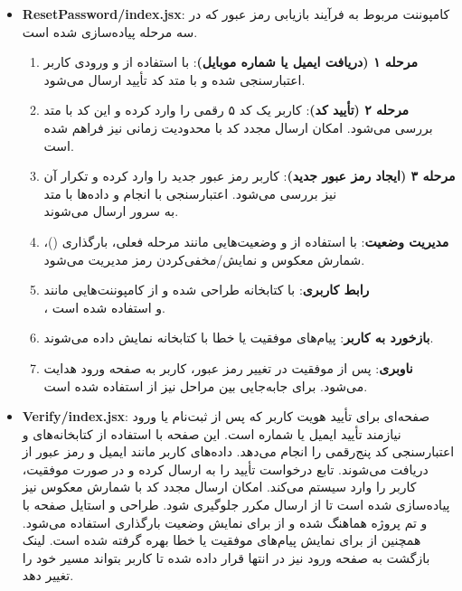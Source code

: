 \begin{itemize}
\begin{itemize}
    			\item \textbf{ResetPassword/index.jsx}: کامپوننت مربوط به فرآیند بازیابی رمز عبور که در سه مرحله پیاده‌سازی شده است.  
    			\begin{enumerate}
    				\item \textbf{مرحله ۱ (دریافت ایمیل یا شماره موبایل)}: با استفاده از  و  ورودی کاربر اعتبارسنجی شده و با متد  کد تأیید ارسال می‌شود.  
    				\item \textbf{مرحله ۲ (تأیید کد)}: کاربر یک کد ۵ رقمی را وارد کرده و این کد با متد \\  بررسی می‌شود. امکان ارسال مجدد کد با محدودیت زمانی نیز فراهم شده است.  
    				\item \textbf{مرحله ۳ (ایجاد رمز عبور جدید)}: کاربر رمز عبور جدید را وارد کرده و تکرار آن نیز بررسی می‌شود. اعتبارسنجی با  انجام و داده‌ها با متد \\ به سرور ارسال می‌شوند.  
    				\item \textbf{مدیریت وضعیت}: با استفاده از  و  وضعیت‌هایی مانند مرحله فعلی، بارگذاری ()، شمارش معکوس و نمایش/مخفی‌کردن رمز مدیریت می‌شود.  
    				\item \textbf{رابط کاربری}: با کتابخانه  طراحی شده و از کامپوننت‌هایی مانند \\ ،  و  استفاده شده است.  
    				\item \textbf{بازخورد به کاربر}: پیام‌های موفقیت یا خطا با کتابخانه  نمایش داده می‌شوند.  
    				\item \textbf{ناوبری}: پس از موفقیت در تغییر رمز عبور، کاربر به صفحه ورود هدایت می‌شود. برای جابه‌جایی بین مراحل نیز از  استفاده شده است.  
    			\end{enumerate}
    			
    			\item \textbf{Verify/index.jsx}: صفحه‌ای برای تأیید هویت کاربر که پس از ثبت‌نام یا ورود نیازمند تأیید ایمیل یا شماره است. این صفحه با استفاده از کتابخانه‌های  و  اعتبارسنجی کد پنج‌رقمی را انجام می‌دهد. داده‌های کاربر مانند ایمیل و رمز عبور از  دریافت می‌شوند. تابع  درخواست تأیید را به  ارسال کرده و در صورت موفقیت، کاربر را وارد سیستم می‌کند. امکان ارسال مجدد کد با شمارش معکوس نیز پیاده‌سازی شده است تا از ارسال مکرر جلوگیری شود. طراحی و استایل صفحه با  و تم پروژه هماهنگ شده و از  برای نمایش وضعیت بارگذاری استفاده می‌شود. همچنین از  برای نمایش پیام‌های موفقیت یا خطا بهره گرفته شده است. لینک بازگشت به صفحه ورود نیز در انتها قرار داده شده تا کاربر بتواند مسیر خود را تغییر دهد.
    			
    		\end{itemize}
    	\end{itemize}
    
